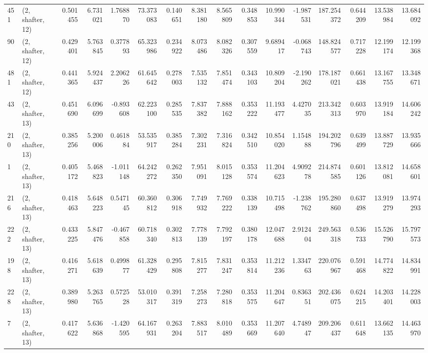 \begin{tabular}{llrrrrrrrrrrrrrr}
451 &  (2, shafter, 12) &   0.501455 &   6.731021 &   1.768870 &    73.373083 &   0.140651 &   8.381180 &   8.565809 &  0.348853 &  10.990344 &  -1.987531 &   187.254372 &   0.644209 &  13.538984 &  13.684092 \\
90  &  (2, shafter, 12) &   0.429401 &   5.763845 &   0.377893 &    65.323986 &   0.234922 &   8.073486 &   8.082326 &  0.307559 &   9.689417 &  -0.068743 &   148.824577 &   0.717228 &  12.199174 &  12.199368 \\
481 &  (2, shafter, 12) &   0.441365 &   5.924437 &   2.206226 &    61.645642 &   0.278003 &   7.535132 &   7.851474 &  0.343103 &  10.809204 &  -2.190262 &   178.187021 &   0.661438 &  13.167755 &  13.348671 \\
43  &  (2, shafter, 13) &   0.451690 &   6.096699 &  -0.893608 &    62.223100 &   0.285535 &   7.837382 &   7.888162 &  0.353222 &  11.193477 &   4.427035 &   213.342313 &   0.603970 &  13.919184 &  14.606242 \\
210 &  (2, shafter, 13) &   0.385256 &   5.200006 &   0.461884 &    53.535917 &   0.385284 &   7.302231 &   7.316824 &  0.342510 &  10.854020 &   1.154888 &   194.202796 &   0.639499 &  13.887729 &  13.935666 \\
1   &  (2, shafter, 13) &   0.405172 &   5.468823 &  -1.011148 &    64.242272 &   0.262350 &   7.951091 &   8.015128 &  0.353574 &  11.204623 &   4.909278 &   214.874585 &   0.601126 &  13.812081 &  14.658601 \\
216 &  (2, shafter, 13) &   0.418463 &   5.648223 &   0.547145 &    60.360812 &   0.306918 &   7.749932 &   7.769222 &  0.338139 &  10.715498 &  -1.238762 &   195.280860 &   0.637498 &  13.919279 &  13.974293 \\
222 &  (2, shafter, 13) &   0.433225 &   5.847476 &  -0.467858 &    60.718340 &   0.302813 &   7.778139 &   7.792197 &  0.380178 &  12.047688 &   2.912404 &   249.563318 &   0.536733 &  15.526790 &  15.797573 \\
198 &  (2, shafter, 13) &   0.416271 &   5.618639 &   0.499877 &    61.328429 &   0.295808 &   7.815277 &   7.831247 &  0.353814 &  11.212236 &   1.334763 &   220.076967 &   0.591468 &  14.774822 &  14.834991 \\
228 &  (2, shafter, 13) &   0.389980 &   5.263765 &   0.572528 &    53.010317 &   0.391319 &   7.258273 &   7.280818 &  0.353575 &  11.204647 &   0.836351 &   202.436075 &   0.624215 &  14.203401 &  14.228003 \\
7   &  (2, shafter, 13) &   0.417622 &   5.636868 &  -1.420595 &    64.167931 &   0.263204 &   7.883517 &   8.010489 &  0.353669 &  11.207640 &   4.748947 &   209.206437 &   0.611648 &  13.662135 &  14.463970 \\

\end{tabular}
